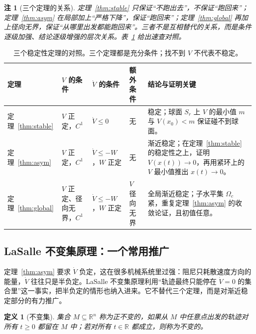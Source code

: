 \documentclass[11pt, a4paper, UTF8, fontset=none]{ctexart}
\theoremstyle{cnthm}
\newtheorem{definition}{定义}[section]
\newtheorem{remark}{注}[section]
\newcommand{\R}{\mathbb{R}}
\begin{document}
\begin{remark}[三个定理的关系]
定理~\ref{thm:stable} 只保证“不跑出去”，不保证“跑回来”；定理~\ref{thm:asym} 在局部加上“严格下降”，保证“跑回来”；定理~\ref{thm:global} 再加上径向无界，保证“从哪里出发都能跑回来”。三者不是互相替代的关系，而是条件逐级加强、结论逐级增强的层次关系。表~\ref{tab:theorems} 给出速查对照。
\end{remark}

\begin{table}[H]
\centering
\small
\begin{tabularx}{\textwidth}{@{}>{\raggedright\arraybackslash}p{1.75cm}>{\raggedright\arraybackslash}p{3.45cm}>{\raggedright\arraybackslash}p{3.0cm}>{\raggedright\arraybackslash}p{2.3cm}X@{}}
\toprule
定理 & $V$ 的条件 & $\dot V$ 的条件 & 额外条件 & 结论与证明关键 \\
\midrule
定理~\ref{thm:stable} & $V$ 正定，$C^1$ & $\dot V\le0$ & 无 & 稳定；球面 $S_r$ 上 $V$ 的最小值 $m$ 与 $V(x_0)<m$ 保证碰不到球面。 \\
定理~\ref{thm:asym} & $V$ 正定，$C^1$ & $\dot V\le -W$，$W$ 正定 & 无 & 渐近稳定；在定理~\ref{thm:stable} 的稳定性之上，证明 $V(x(t))\to0$，再用紧环上的 $V$ 最小值推出 $x(t)\to0$。 \\
定理~\ref{thm:global} & $V$ 正定、径向无界，$C^1$ & $\dot V\le -W$，$W$ 正定 & $V$ 径向无界 & 全局渐近稳定；子水平集 $\Omega_c$ 紧，重复定理~\ref{thm:asym} 的收敛论证，且初值任意。 \\
\bottomrule
\end{tabularx}
\caption{三个稳定性定理的对照。三个定理都是充分条件；找不到 $V$ 不代表不稳定。}
\label{tab:theorems}
\end{table}

\subsection{LaSalle 不变集原理：一个常用推广}

定理~\ref{thm:asym} 要求 $\dot V$ 负定，这在很多机械系统里过强：阻尼只耗散速度方向的能量，$\dot V$ 往往只是半负定。LaSalle 不变集原理利用“轨迹最终只能停在 $\dot V=0$ 的集合里”这一事实，把半负定的情形也纳入进来。它不替代三个定理，而是对渐近稳定部分的有力推广。

\begin{definition}[不变集]
集合 $M\subseteq\R^n$ 称为正不变的，如果从 $M$ 中任意点出发的轨迹对所有 $t\ge0$ 都留在 $M$ 中；若对所有 $t\in\R$ 都成立，则称为不变的。
\end{definition}
\end{document}
